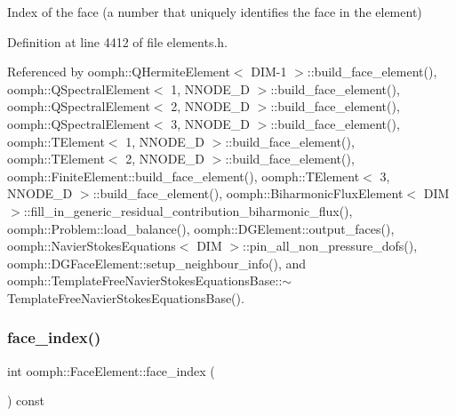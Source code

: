 Index of the face (a number that uniquely identifies the face in the element) 



Definition at line 4412 of file elements.\+h.



Referenced by oomph\+::\+Q\+Hermite\+Element$<$ D\+I\+M-\/1 $>$\+::build\+\_\+face\+\_\+element(), oomph\+::\+Q\+Spectral\+Element$<$ 1, N\+N\+O\+D\+E\+\_\+D $>$\+::build\+\_\+face\+\_\+element(), oomph\+::\+Q\+Spectral\+Element$<$ 2, N\+N\+O\+D\+E\+\_\+D $>$\+::build\+\_\+face\+\_\+element(), oomph\+::\+Q\+Spectral\+Element$<$ 3, N\+N\+O\+D\+E\+\_\+D $>$\+::build\+\_\+face\+\_\+element(), oomph\+::\+T\+Element$<$ 1, N\+N\+O\+D\+E\+\_\+D $>$\+::build\+\_\+face\+\_\+element(), oomph\+::\+T\+Element$<$ 2, N\+N\+O\+D\+E\+\_\+D $>$\+::build\+\_\+face\+\_\+element(), oomph\+::\+Finite\+Element\+::build\+\_\+face\+\_\+element(), oomph\+::\+T\+Element$<$ 3, N\+N\+O\+D\+E\+\_\+D $>$\+::build\+\_\+face\+\_\+element(), oomph\+::\+Biharmonic\+Flux\+Element$<$ D\+I\+M $>$\+::fill\+\_\+in\+\_\+generic\+\_\+residual\+\_\+contribution\+\_\+biharmonic\+\_\+flux(), oomph\+::\+Problem\+::load\+\_\+balance(), oomph\+::\+D\+G\+Element\+::output\+\_\+faces(), oomph\+::\+Navier\+Stokes\+Equations$<$ D\+I\+M $>$\+::pin\+\_\+all\+\_\+non\+\_\+pressure\+\_\+dofs(), oomph\+::\+D\+G\+Face\+Element\+::setup\+\_\+neighbour\+\_\+info(), and oomph\+::\+Template\+Free\+Navier\+Stokes\+Equations\+Base\+::$\sim$\+Template\+Free\+Navier\+Stokes\+Equations\+Base().

\mbox{\label{classoomph_1_1FaceElement_a387bc31caaf8c6a8c2f8b287823bfd85}} 
\subsubsection{\texorpdfstring{face\+\_\+index()}{face\_index()}\hspace{0.1cm}{\footnotesize\ttfamily [2/2]}}
{\footnotesize\ttfamily int oomph\+::\+Face\+Element\+::face\+\_\+index (\begin{DoxyParamCaption}{ }\end{DoxyParamCaption}) const\hspace{0.3cm}{\ttfamily [inline]}}



